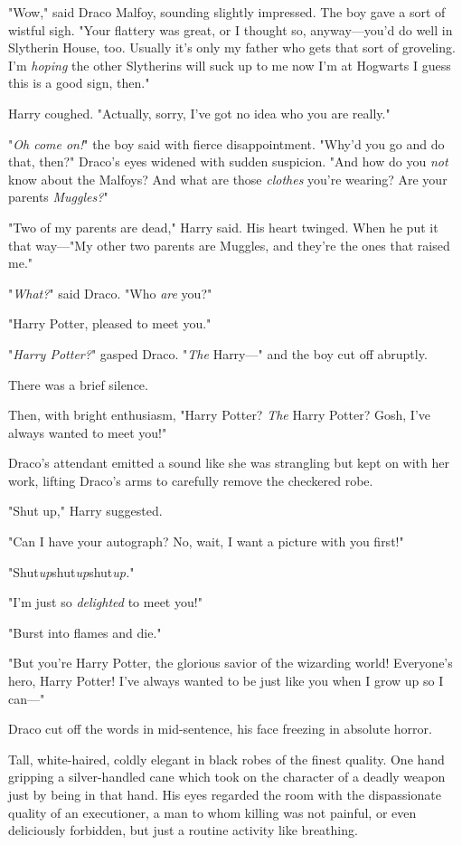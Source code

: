 "Wow," said Draco Malfoy, sounding slightly impressed. The boy gave a sort of
wistful sigh. "Your flattery was great, or I thought so, anyway---you'd do well
in Slytherin House, too. Usually it's only my father who gets that sort of
groveling. I'm \emph{hoping} the other Slytherins will suck up to me now I'm
at Hogwarts{\el} I guess this is a good sign, then."

Harry coughed. "Actually, sorry, I've got no idea who you are really."

"\emph{Oh come on!}" the boy said with fierce disappointment. "Why'd you go and
do that, then?" Draco's eyes widened with sudden suspicion. "And how do you
\emph{not} know about the Malfoys? And what are those \emph{clothes} you're
wearing? Are your parents \emph{Muggles?}"

"Two of my parents are dead," Harry said. His heart twinged. When he put it
that way\mbox{---}"My other two parents are Muggles, and they're the ones that raised
me."

"\emph{What?}" said Draco. "Who \emph{are} you?"

"Harry Potter, pleased to meet you."

"\emph{Harry Potter?}" gasped Draco. "\emph{The} Harry\mbox{---}" and the boy cut off
abruptly.

There was a brief silence.

Then, with bright enthusiasm, "Harry Potter? \emph{The} Harry Potter? Gosh,
I've always wanted to meet you!"

Draco's attendant emitted a sound like she was strangling but kept on with her
work, lifting Draco's arms to carefully remove the checkered robe.

"Shut up," Harry suggested.

"Can I have your autograph? No, wait, I want a picture with you first!"

"Shut\emph{up}shut\emph{up}shut\emph{up.}"

"I'm just so \emph{delighted} to meet you!"

"Burst into flames and die."

"But you're Harry Potter, the glorious savior of the wizarding world!
Everyone's hero, Harry Potter! I've always wanted to be just like you when I
grow up so I can\mbox{---}"

Draco cut off the words in mid-sentence, his face freezing in absolute horror.

Tall, white-haired, coldly elegant in black robes of the finest quality. One
hand gripping a silver-handled cane which took on the character of a deadly
weapon just by being in that hand. His eyes regarded the room with the
dispassionate quality of an executioner, a man to whom killing was not painful,
or even deliciously forbidden, but just a routine activity like breathing.

